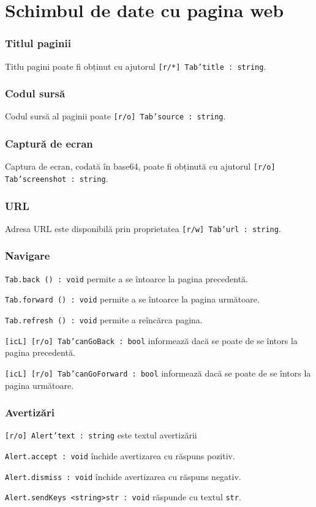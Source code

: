 \section{Schimbul de date cu pagina web}
\label{dataexchange}

\subsubsection{Titlul paginii}

Titlu pagini poate fi obținut cu ajutorul \texttt{[r/*] Tab'title : string}.

\subsubsection{Codul sursă}

Codul sursă al paginii poate \texttt{[r/o] Tab'source : string}.

\subsubsection{Captură de ecran}

Captura de ecran, codată în base64, poate fi obținută cu ajutorul \texttt{[r/o] Tab'screenshot : string}.

\subsubsection{URL}

Adresa URL este disponibilă prin proprietatea \texttt{[r/w] Tab'url : string}.

\subsubsection{Navigare}

\texttt{Tab.back () : void} permite a se întoarce la pagina precedentă.

\texttt{Tab.forward () : void} permite a se întoarce la pagina următoare.

\texttt{Tab.refresh () : void}  permite a reîncărca pagina.

\texttt{[icL] [r/o] Tab'canGoBack : bool} informează dacă se poate de se întors la pagina precedentă.

\texttt{[icL] [r/o] Tab'canGoForward : bool} informează dacă se poate de se întors la pagina următoare.


\subsubsection{Avertizări}

\texttt{[r/o] Alert'text : string} este textul avertizării

\texttt{Alert.accept : void} închide avertizarea cu răspuns pozitiv.

\texttt{Alert.dismiss : void} închide avertizarea cu răspuns negativ.

\texttt{Alert.sendKeys <string>str : void} răspunde cu textul \texttt{str}.

